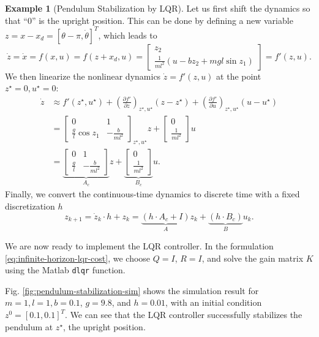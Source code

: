 \documentclass[
]{book}
\theoremstyle{definition}
\theoremstyle{definition}
\newtheorem{example}{Example}[chapter]
\theoremstyle{definition}
\theoremstyle{definition}
\theoremstyle{remark}
\begin{document}
\begin{example}[Pendulum Stabilization by LQR]
Let us first shift the dynamics so that ``\(0\)'' is the upright position. This can be done by defining a new variable \(z = x - x_d = [\theta - \pi, \dot{\theta}]^T\), which leads to
\begin{equation}
\dot{z} = \dot{x} = f(x,u) = f(z + x_d,u) = \begin{bmatrix}
z_2 \\
\frac{1}{ml^2} \left( u - b z_2 + mgl \sin z_1  \right)
\end{bmatrix} = f'(z,u).
\label{eq:pendulum-dynamics-z-coordinate}
\end{equation}
We then linearize the nonlinear dynamics \(\dot{z} = f'(z,u)\) at the point \(z^\star = 0, u^\star = 0\):
\begin{align}
\dot{z} & \approx f'(z^\star,u^\star) + \left( \frac{\partial f'}{\partial z} \right)_{z^\star,u^\star} (z - z^\star) + \left( \frac{\partial f'}{\partial u} \right)_{z^\star,u^\star} (u - u^\star) \\
& = \begin{bmatrix}
0 & 1 \\
\frac{g}{l} \cos z_1 & - \frac{b}{ml^2}
\end{bmatrix}_{z^\star, u^\star} z + 
\begin{bmatrix}
0 \\
\frac{1}{ml^2}
\end{bmatrix} u \\
& = \underbrace{\begin{bmatrix}
0 & 1 \\
\frac{g}{l} & - \frac{b}{ml^2}
\end{bmatrix}}_{A_c} z  + 
\underbrace{\begin{bmatrix}
0 \\
\frac{1}{ml^2}
\end{bmatrix}}_{B_c} u.
\end{align}
Finally, we convert the continuous-time dynamics to discrete time with a fixed discretization \(h\)
\[
z_{k+1} = \dot{z}_k \cdot h + z_k = \underbrace{(h \cdot A_c + I )}_{A} z_k + \underbrace{(h \cdot B_c)}_{B} u_k.
\]

We are now ready to implement the LQR controller. In the formulation \eqref{eq:infinite-horizon-lqr-cost}, we choose \(Q = I\), \(R = I\), and solve the gain matrix \(K\) using the Matlab \texttt{dlqr} function.

Fig. \ref{fig:pendulum-stabilization-sim} shows the simulation result for \(m=1,l=1,b=0.1\), \(g = 9.8\), and \(h = 0.01\), with an initial condition \(z^0 = [0.1,0.1]^T\). We can see that the LQR controller successfully stabilizes the pendulum at \(z^\star\), the upright position.


\end{example}
\end{document}
